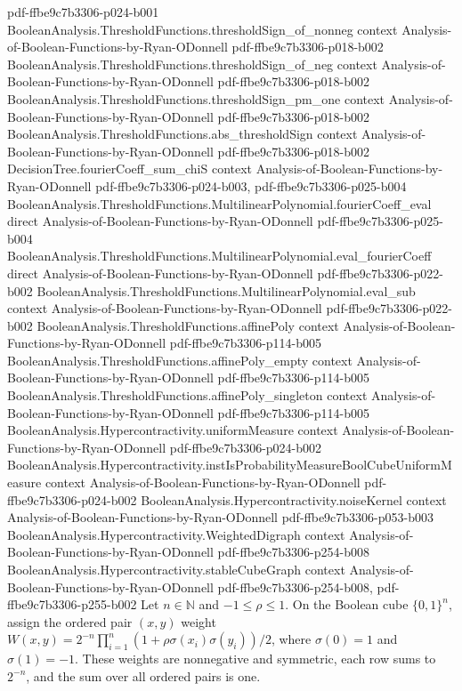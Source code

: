 \begin{theorem}
  {pdf-ffbe9c7b3306-p024-b001}
\proofstep
  {BooleanAnalysis.ThresholdFunctions.thresholdSign_of_nonneg}
  {context}
  {Analysis-of-Boolean-Functions-by-Ryan-ODonnell}
  {pdf-ffbe9c7b3306-p018-b002}
\proofstep
  {BooleanAnalysis.ThresholdFunctions.thresholdSign_of_neg}
  {context}
  {Analysis-of-Boolean-Functions-by-Ryan-ODonnell}
  {pdf-ffbe9c7b3306-p018-b002}
\proofstep
  {BooleanAnalysis.ThresholdFunctions.thresholdSign_pm_one}
  {context}
  {Analysis-of-Boolean-Functions-by-Ryan-ODonnell}
  {pdf-ffbe9c7b3306-p018-b002}
\proofstep
  {BooleanAnalysis.ThresholdFunctions.abs_thresholdSign}
  {context}
  {Analysis-of-Boolean-Functions-by-Ryan-ODonnell}
  {pdf-ffbe9c7b3306-p018-b002}
\proofstep
  {DecisionTree.fourierCoeff_sum_chiS}
  {context}
  {Analysis-of-Boolean-Functions-by-Ryan-ODonnell}
  {pdf-ffbe9c7b3306-p024-b003,
    pdf-ffbe9c7b3306-p025-b004}
\proofstep
  {BooleanAnalysis.ThresholdFunctions.MultilinearPolynomial.fourierCoeff_eval}
  {direct}
  {Analysis-of-Boolean-Functions-by-Ryan-ODonnell}
  {pdf-ffbe9c7b3306-p025-b004}
\proofstep
  {BooleanAnalysis.ThresholdFunctions.MultilinearPolynomial.eval_fourierCoeff}
  {direct}
  {Analysis-of-Boolean-Functions-by-Ryan-ODonnell}
  {pdf-ffbe9c7b3306-p022-b002}
\proofstep
  {BooleanAnalysis.ThresholdFunctions.MultilinearPolynomial.eval_sub}
  {context}
  {Analysis-of-Boolean-Functions-by-Ryan-ODonnell}
  {pdf-ffbe9c7b3306-p022-b002}
\proofstep
  {BooleanAnalysis.ThresholdFunctions.affinePoly}
  {context}
  {Analysis-of-Boolean-Functions-by-Ryan-ODonnell}
  {pdf-ffbe9c7b3306-p114-b005}
\proofstep
  {BooleanAnalysis.ThresholdFunctions.affinePoly_empty}
  {context}
  {Analysis-of-Boolean-Functions-by-Ryan-ODonnell}
  {pdf-ffbe9c7b3306-p114-b005}
\proofstep
  {BooleanAnalysis.ThresholdFunctions.affinePoly_singleton}
  {context}
  {Analysis-of-Boolean-Functions-by-Ryan-ODonnell}
  {pdf-ffbe9c7b3306-p114-b005}
\proofstep
  {BooleanAnalysis.Hypercontractivity.uniformMeasure}
  {context}
  {Analysis-of-Boolean-Functions-by-Ryan-ODonnell}
  {pdf-ffbe9c7b3306-p024-b002}
\proofstep
  {BooleanAnalysis.Hypercontractivity.instIsProbabilityMeasureBoolCubeUniformMeasure}
  {context}
  {Analysis-of-Boolean-Functions-by-Ryan-ODonnell}
  {pdf-ffbe9c7b3306-p024-b002}
\proofstep
  {BooleanAnalysis.Hypercontractivity.noiseKernel}
  {context}
  {Analysis-of-Boolean-Functions-by-Ryan-ODonnell}
  {pdf-ffbe9c7b3306-p053-b003}
\proofstep
  {BooleanAnalysis.Hypercontractivity.WeightedDigraph}
  {context}
  {Analysis-of-Boolean-Functions-by-Ryan-ODonnell}
  {pdf-ffbe9c7b3306-p254-b008}
\proofstep
  {BooleanAnalysis.Hypercontractivity.stableCubeGraph}
  {context}
  {Analysis-of-Boolean-Functions-by-Ryan-ODonnell}
  {pdf-ffbe9c7b3306-p254-b008,
    pdf-ffbe9c7b3306-p255-b002}
Let $n\in\mathbb N$ and $-1\le\rho\le1$. On the Boolean cube $\{0,1\}^n$, assign
the ordered pair $(x,y)$ weight
$W(x,y)=2^{-n}\prod_{i=1}^n(1+\rho\sigma(x_i)\sigma(y_i))/2$, where $\sigma(0)=1$
and $\sigma(1)=-1$. These weights are nonnegative and symmetric, each row sums to
$2^{-n}$, and the sum over all ordered pairs is one.
\end{theorem}

